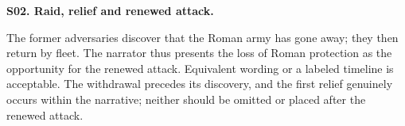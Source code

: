 \par\begin{minipage}{\linewidth}\raggedright
\textbf{S02. Raid, relief and renewed attack.}






The former adversaries discover that the Roman army has gone away; they then return by fleet. The narrator thus presents the loss of Roman protection as the opportunity for the renewed attack. Equivalent wording or a labeled timeline is acceptable. The withdrawal precedes its discovery, and the first relief genuinely occurs within the narrative; neither should be omitted or placed after the renewed attack.

\end{minipage}\par\addvspace{4pt}

